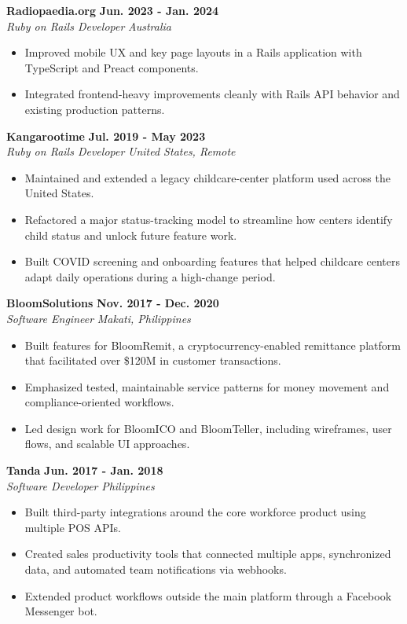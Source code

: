 \documentclass[10pt,letterpaper]{article}
\newcommand{\roleentry}[4]{%
  \textbf{#1} \hfill \textbf{#2}\\
  \textit{#3} \hfill \textit{#4}\\[-2pt]
}
\begin{document}
\roleentry{Radiopaedia.org}{Jun. 2023 - Jan. 2024}{Ruby on Rails Developer}{Australia}
\begin{itemize}
  \item Improved mobile UX and key page layouts in a Rails application with TypeScript and Preact components.
  \item Integrated frontend-heavy improvements cleanly with Rails API behavior and existing production patterns.
\end{itemize}

\roleentry{Kangarootime}{Jul. 2019 - May 2023}{Ruby on Rails Developer}{United States, Remote}
\begin{itemize}
  \item Maintained and extended a legacy childcare-center platform used across the United States.
  \item Refactored a major status-tracking model to streamline how centers identify child status and unlock future feature work.
  \item Built COVID screening and onboarding features that helped childcare centers adapt daily operations during a high-change period.
\end{itemize}

\roleentry{BloomSolutions}{Nov. 2017 - Dec. 2020}{Software Engineer}{Makati, Philippines}
\begin{itemize}
  \item Built features for BloomRemit, a cryptocurrency-enabled remittance platform that facilitated over \$120M in customer transactions.
  \item Emphasized tested, maintainable service patterns for money movement and compliance-oriented workflows.
  \item Led design work for BloomICO and BloomTeller, including wireframes, user flows, and scalable UI approaches.
\end{itemize}

\roleentry{Tanda}{Jun. 2017 - Jan. 2018}{Software Developer}{Philippines}
\begin{itemize}
  \item Built third-party integrations around the core workforce product using multiple POS APIs.
  \item Created sales productivity tools that connected multiple apps, synchronized data, and automated team notifications via webhooks.
  \item Extended product workflows outside the main platform through a Facebook Messenger bot.
\end{itemize}
\end{document}
